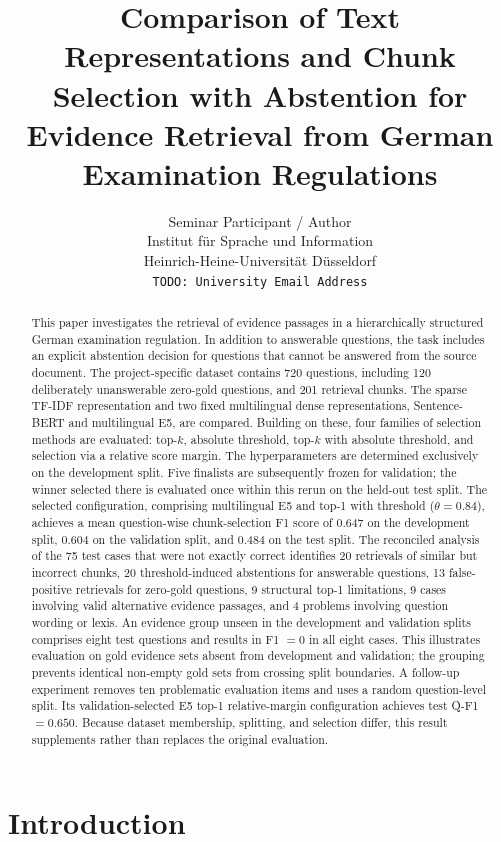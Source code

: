 \documentclass[11pt]{article}
\title{Comparison of Text Representations and Chunk Selection with Abstention for Evidence Retrieval from German Examination Regulations}
\author{Seminar Participant / Author \\
  Institut für Sprache und Information \\
  Heinrich-Heine-Universität Düsseldorf \\
  \texttt{TODO: University Email Address}}
\newcommand{\revision}[1]{#1}
\begin{document}
\maketitle

\begin{abstract}
This paper investigates the retrieval of evidence passages in a hierarchically structured German examination regulation. In addition to answerable questions, the task includes an explicit abstention decision for questions that cannot be answered from the source document. The project-specific dataset contains 720 questions, including 120 deliberately unanswerable zero-gold questions, and 201 retrieval chunks. The sparse TF-IDF representation and two fixed multilingual dense representations, Sentence-BERT and multilingual E5, are compared. Building on these, four families of selection methods are evaluated: top-$k$, absolute threshold, top-$k$ with absolute threshold, and selection via a relative score margin. The hyperparameters are determined exclusively on the development split. Five finalists are subsequently frozen for validation; the winner selected there is evaluated once within this rerun on the held-out test split. The selected configuration, comprising multilingual E5 and top-1 with threshold ($\theta=0.84$), achieves a mean question-wise chunk-selection F1 score of $0.647$ on the development split, $0.604$ on the validation split, and $0.484$ on the test split. The reconciled analysis of the 75 test cases that were not exactly correct identifies 20 retrievals of similar but incorrect chunks, 20 threshold-induced abstentions for answerable questions, 13 false-positive retrievals for zero-gold questions, 9 structural top-1 limitations, 9 cases involving valid alternative evidence passages, and 4 problems involving question wording or lexis. An evidence group unseen in the development and validation splits comprises eight test questions and results in F1 $=0$ in all eight cases. \revision{This illustrates evaluation on gold evidence sets absent from development and validation; the grouping prevents identical non-empty gold sets from crossing split boundaries. A follow-up experiment removes ten problematic evaluation items and uses a random question-level split. Its validation-selected E5 top-1 relative-margin configuration achieves test Q-F1 $=0.650$. Because dataset membership, splitting, and selection differ, this result supplements rather than replaces the original evaluation.}
\end{abstract}


\section{Introduction}
\end{document}
